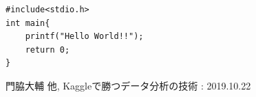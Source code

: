 \documentclass[titlepage, a4paper, 11pt, dvipdfmx]{jsarticle}
\begin{document}

\begin{lstlisting}[caption=キャプション, label=Label_Program_2]
#include<stdio.h>
int main{
    printf("Hello World!!");
    return 0;
}
\end{lstlisting}

\begin{thebibliography}{1}
 門脇大輔 他, Kaggleで勝つデータ分析の技術 : 2019.10.22
\end{thebibliography}
\end{document}

